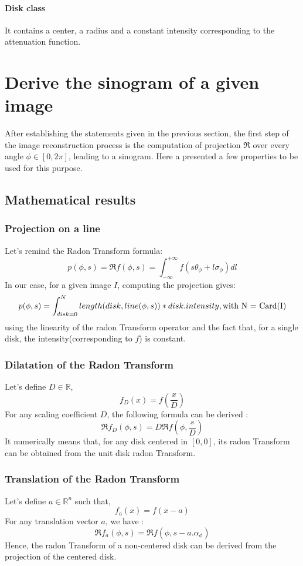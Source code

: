 \documentclass[a4,12pt]{article}
\begin{document}
\paragraph{Disk class}
It contains a center, a radius and a constant intensity corresponding to the attenuation function. 

\section{Derive the sinogram of a given image}
After establishing the statements given in the previous section, the first step of the image reconstruction process is the computation of projection $\Re$ over every angle $\phi \in [0,2\pi]$, leading to a sinogram. Here a presented a few properties to be used for this purpose.

\subsection{Mathematical results}
\subsubsection{Projection on a line}
Let's remind the Radon Transform formula:
\[
p(\phi,s) = \Re f(\phi,s) = \int_{-\infty}^{+\infty}f(s\theta_{\phi} + l\sigma_{\phi})dl
\]
In our case, for a given image $I$, computing the projection gives:
\[
p(\phi,s) = \int_{disk = 0}^{N}length(disk,line(\phi,s))*disk.intensity, \text{with N = Card(I) \\}
\] 
using the linearity of the radon Transform operator and the fact that, for a single disk, the intensity(corresponding to $f$) is constant.

\subsubsection{Dilatation of the Radon Transform}
Let's define $D \in \mathbb{R}$,
\[
	f_{D}(x) = f(\frac{x}{D})
\]
For any scaling coefficient $D$, the following formula can be derived : 
\[
\Re f_{D}(\phi,s) = D\Re f(\phi,\frac{s}{D})
\]
It numerically means that, for any disk centered in $[0,0]$, its radon Transform can be obtained from the unit disk radon Transform.

\subsubsection{Translation of the Radon Transform}
Let's define $a \in \mathbb{R}^{n}$ such that, 
\[
	f_{a}(x) = f(x-a)
\]
For any translation vector $a$, we have :
\[
\Re f_{a}(\phi,s) = \Re f(\phi,s-a.\alpha_{\phi})
\]
Hence, the radon Transform of a non-centered disk can be derived from the projection of the centered disk. \\ \\
\end{document}
